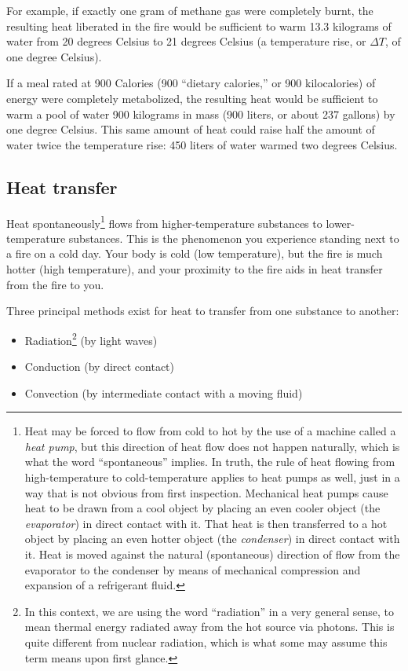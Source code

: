 For example, if exactly one gram of methane gas were completely burnt, the resulting heat liberated in the fire would be sufficient to warm 13.3 kilograms of water from 20 degrees Celsius to 21 degrees Celsius (a temperature rise, or $\Delta T$, of one degree Celsius).

If a meal rated at 900 Calories (900 ``dietary calories,'' or 900 kilocalories) of energy were completely metabolized, the resulting heat would be sufficient to warm a pool of water 900 kilograms in mass (900 liters, or about 237 gallons) by one degree Celsius.  This same amount of heat could raise half the amount of water twice the temperature rise: 450 liters of water warmed two degrees Celsius.






\filbreak
\subsection{Heat transfer}

Heat spontaneously\footnote{Heat may be forced to flow from cold to hot by the use of a machine called a \textit{heat pump}, but this direction of heat flow does not happen naturally, which is what the word ``spontaneous'' implies.  In truth, the rule of heat flowing from high-temperature to cold-temperature applies to heat pumps as well, just in a way that is not obvious from first inspection.  Mechanical heat pumps cause heat to be drawn from a cool object by placing an even cooler object (the \textit{evaporator}) in direct contact with it.  That heat is then transferred to a hot object by placing an even hotter object (the \textit{condenser}) in direct contact with it.  Heat is moved against the natural (spontaneous) direction of flow from the evaporator to the condenser by means of mechanical compression and expansion of a refrigerant fluid.} flows from higher-temperature substances to lower-temperature substances.  This is the phenomenon you experience standing next to a fire on a cold day.  Your body is cold (low temperature), but the fire is much hotter (high temperature), and your proximity to the fire aids in heat transfer from the fire to you.  

Three principal methods exist for heat to transfer from one substance to another:

\begin{itemize}
\item Radiation\footnote{In this context, we are using the word ``radiation'' in a very general sense, to mean thermal energy radiated away from the hot source via photons.  This is quite different from nuclear radiation, which is what some may assume this term means upon first glance.} (by light waves)
\item Conduction (by direct contact)
\item Convection (by intermediate contact with a moving fluid)
\end{itemize}

